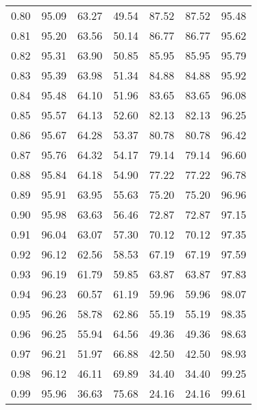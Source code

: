 \begin{tabular}{|c|c|c|c|c|c|c|}
      0.80 &     95.09 &     63.27 &      49.54 &   87.52 &      87.52 &         95.48 \\
      0.81 &     95.20 &     63.56 &      50.14 &   86.77 &      86.77 &         95.62 \\
      0.82 &     95.31 &     63.90 &      50.85 &   85.95 &      85.95 &         95.79 \\
      0.83 &     95.39 &     63.98 &      51.34 &   84.88 &      84.88 &         95.92 \\
      0.84 &     95.48 &     64.10 &      51.96 &   83.65 &      83.65 &         96.08 \\
      0.85 &     95.57 &     64.13 &      52.60 &   82.13 &      82.13 &         96.25 \\
      0.86 &     95.67 &     64.28 &      53.37 &   80.78 &      80.78 &         96.42 \\
      0.87 &     95.76 &     64.32 &      54.17 &   79.14 &      79.14 &         96.60 \\
      0.88 &     95.84 &     64.18 &      54.90 &   77.22 &      77.22 &         96.78 \\
      0.89 &     95.91 &     63.95 &      55.63 &   75.20 &      75.20 &         96.96 \\
      0.90 &     95.98 &     63.63 &      56.46 &   72.87 &      72.87 &         97.15 \\
      0.91 &     96.04 &     63.07 &      57.30 &   70.12 &      70.12 &         97.35 \\
      0.92 &     96.12 &     62.56 &      58.53 &   67.19 &      67.19 &         97.59 \\
      0.93 &     96.19 &     61.79 &      59.85 &   63.87 &      63.87 &         97.83 \\
      0.94 &     96.23 &     60.57 &      61.19 &   59.96 &      59.96 &         98.07 \\
      0.95 &     96.26 &     58.78 &      62.86 &   55.19 &      55.19 &         98.35 \\
      0.96 &     96.25 &     55.94 &      64.56 &   49.36 &      49.36 &         98.63 \\
      0.97 &     96.21 &     51.97 &      66.88 &   42.50 &      42.50 &         98.93 \\
      0.98 &     96.12 &     46.11 &      69.89 &   34.40 &      34.40 &         99.25 \\
      0.99 &     95.96 &     36.63 &      75.68 &   24.16 &      24.16 &         99.61 \\
\bottomrule
\end{tabular}
